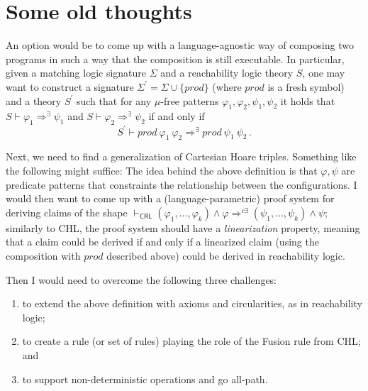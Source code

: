 \documentclass{article}
\newcommand{\CRL}{\mathsf{CRL}}
\begin{document}



\appendix

\section{Some old thoughts}

An option would be to come up with a language-agnostic way of composing two programs in such a way
that the composition is still executable.
In particular, given a matching logic signature $\Sigma$ and a reachability logic theory $S$, one may
want to construct a signature $\Sigma^\prime = \Sigma \cup \{ \mathit{prod} \}$
(where $\mathit{prod}$ is a fresh symbol)
and a theory $S^\prime$ such that for any $\mu$-free patterns $\varphi_1,\varphi_2,\psi_1,\psi_2$
it holds that $S \vdash \varphi_1 \Rightarrow^\exists \psi_1$ and
$S \vdash \varphi_2 \Rightarrow^\exists \psi_2$ if and only if
\begin{equation*}
S^\prime \vdash \mathit{prod}\ \varphi_1\ \varphi_2 \Rightarrow^\exists \mathit{prod}\ \psi_1\ \psi_2    \, .
\end{equation*}

Next, we need to find a generalization of Cartesian Hoare triples.
Something like the following might suffice:
The idea behind the above definition is that $\varphi,\psi$ are predicate patterns
that constraints the relationship between the configurations.
I would then want to come up with a (language-parametric) proof system
for deriving claims of the shape
$\vdash_\CRL (\varphi_1,\ldots,\varphi_k) \land \varphi \Rightarrow^{c\exists}
(\psi_1,\ldots,\psi_k) \land \psi$;
similarly to CHL, the proof system should have a \emph{linearization} property,
meaning that a claim could be derived if and only if
a linearized claim (using the composition with $\textit{prod}$ described above) could be derived in reachability logic.

Then I would need to overcome the following three challenges:
\begin{enumerate}
    \item to extend the above definition with axioms and circularities, as in reachability logic;
    \item to create a rule (or set of rules) playing the role of the Fusion rule from CHL; and
    \item to support non-deterministic operations and go all-path.
\end{enumerate}
\end{document}
